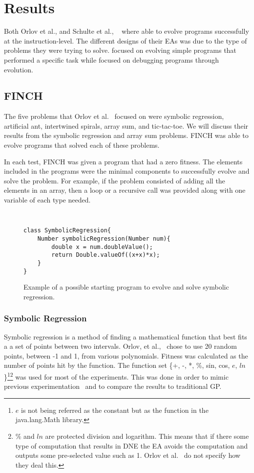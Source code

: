 \documentclass{sig-alternate}
\begin{document}
\section{Results}
Both Orlov et al., and Schulte et al., ~\cite{FINCH:2011, Assembly:2010} where able to evolve programs successfully at the instruction-level. The different designs of their EAs was due to the type of problems they were trying to solve. \cite{FINCH:2011} focused on evolving simple programs that performed a specific task while \cite{Assembly:2010} focused on debugging programs through evolution.

\subsection{FINCH}
The five problems that Orlov et al.~\cite{Assembly:2010} focused on were symbolic regression, artificial ant, intertwined spirals, array sum, and tic-tac-toe. We will discuss their results from the symbolic regression and array sum problems. FINCH was able to evolve programs that solved each of these problems.

In each test, FINCH was given a program that had a zero fitness. The elements included in the programs were the minimal components to successfully evolve and solve the problem. For example, if the problem consisted of adding all the elements in an array, then a loop or a recursive call was provided along with one variable of each type needed.

\begin{figure}
\centering
{\tt
\begin{verbatim}
class SymbolicRegression{
    Number symbolicRegression(Number num){
        double x = num.doubleValue();
        return Double.valueOf((x+x)*x);
    }
}
\end{verbatim}
}
\caption{Example of a possible starting program to evolve and solve symbolic regression.}
\label{regression}
\end{figure}
\subsubsection{Symbolic Regression}
Symbolic regression is a method of finding a mathematical function that best fits a a set of points between two intervals. Orlov, et al.,~\cite{FINCH:2011} chose to use 20 random points, between -1 and 1, from various polynomials. Fitness was calculated as the number of points hit by the function. The function set \{+, -, *, \%, sin, cos, $e$, $ln$\}\footnote{$e$ is not being referred as the constant but as the function in the java.lang.Math library.}\footnote{\% and $ln$ are protected division and logarithm. This means that if there some type of computation that results in DNE the EA avoids the computation and outputs some pre-selected value such as 1. Orlov et al.~\cite{FINCH:2011} do not specify how they deal this.} was used for most of the experiments. This was done in order to mimic previous experimentation~\cite{koza:1992} and to compare the results to traditional GP.
\end{document}
